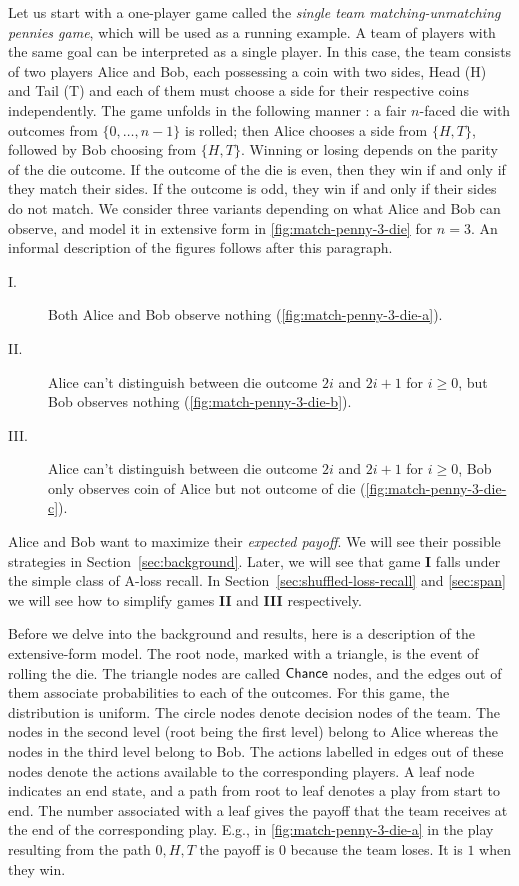 Let us start with a one-player game called the \emph{single team matching-unmatching pennies game}, which will be used as a running example. A team of players with the same goal can be interpreted as a single player. 
In this case, the team consists of two players Alice and Bob, each possessing a coin with two sides, Head (H) and Tail (T) and each of them must choose a side for their respective coins independently. 
The game unfolds in the following manner : a fair $n$-faced die with outcomes from $\{0, \dots, n-1 \}$ is rolled; then Alice chooses a side from $\{H,T\}$, followed by Bob choosing from $\{H,T\}$. Winning or losing depends on the parity of the die outcome. If the outcome of the die is even, then they win if and only if they match their sides. If the outcome is odd, they win if and only if their sides do not match. We consider three variants depending on what Alice and Bob can observe, and model it in extensive form in \cref{fig:match-penny-3-die} for $n=3$. An informal description of the figures follows after this paragraph.
\begin{description}
  \item[I.] Both Alice and Bob observe nothing (\cref{fig:match-penny-3-die-a}).
  \item[II.] Alice can't distinguish between die outcome $2i$ and $2i+1$ for $i \geq 0$,  but Bob observes nothing (\cref{fig:match-penny-3-die-b}).
   \item[III.] Alice can't distinguish between die outcome $2i$ and $2i+1$ for $i \geq 0$, Bob only observes coin of Alice but not outcome of die (\cref{fig:match-penny-3-die-c}). 
 \end{description} 
Alice and Bob want to maximize their \emph{expected payoff}. We will see their possible strategies in Section~\ref{sec:background}.  
Later, we will see that game \textbf{I} falls under the simple class of A-loss recall. 
In Section~\ref{sec:shuffled-loss-recall} and \cref{sec:span} we will see how to simplify games \textbf{II} and \textbf{III} respectively. 


Before we delve into the background and results, here is a description of the extensive-form model. 
The root node, marked with a triangle, is the event of rolling the die. The triangle nodes are called $\mathsf{Chance}$ nodes, and the
edges out of them associate probabilities to each of the outcomes. For this game, the distribution is uniform. The circle nodes denote decision nodes of the team. The nodes in the second level (root being the first level) belong to Alice whereas the nodes in the third level belong to Bob. The actions labelled in edges out of these nodes denote the actions available to the corresponding players. 
A leaf node indicates an end state, and a path from root to leaf denotes
a play from start to end. The number associated with a leaf gives the
payoff that the team receives at the end of the corresponding play. E.g., in \cref{fig:match-penny-3-die-a} in the play resulting from the path $0, H, T$ the payoff is $0$ because the team loses. It is $1$ when they win. 

